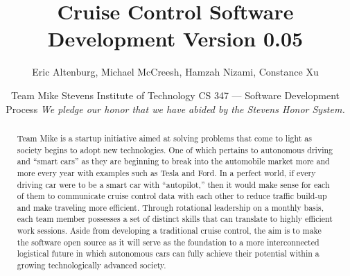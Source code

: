 \documentclass[preprint,11pt,3p]{article}
\title{Cruise Control Software Development Version 0.05}
\author{
Eric Altenburg, Michael McCreesh, Hamzah Nizami, Constance Xu}
\date{
	Team Mike\endgraf\bigskip
	Stevens Institute of Technology\endgraf\bigskip
	CS 347 — Software Development Process\endgraf\bigskip
	\textit{We pledge our honor that we have abided by the Stevens Honor System.}}
\begin{document}
\maketitle
\newpage

\tableofcontents
\newpage

\begin{abstract}
	Team Mike is a startup initiative aimed at solving problems that come to light as
society begins to adopt new technologies. One of which pertains to autonomous
driving and “smart cars” as they are beginning to break into the automobile
market more and more every year with examples such as Tesla and Ford. In a
perfect world, if every driving car were to be a smart car with “autopilot,” then
it would make sense for each of them to communicate cruise control data with
each other to reduce traffic build-up and make traveling more efficient. Through
rotational leadership on a monthly basis, each team member possesses a set of
distinct skills that can translate to highly efficient work sessions. Aside from
developing a traditional cruise control, the aim is to make the software open source as it will serve as the foundation to a more interconnected logistical future in which autonomous cars can fully achieve
their potential within a growing technologically advanced society. 
\end{abstract}
\end{document}
